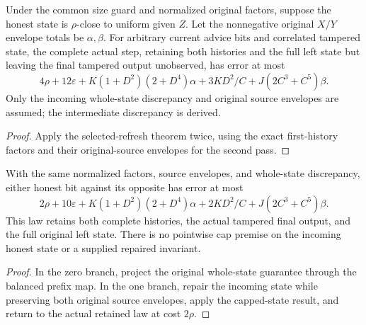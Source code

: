 \begin{theorem}
  \label{thm:lowerbounds-algebraic-flipflop-weak}
  \leanok
  Under the common size guard and normalized original factors, suppose
  the honest state is $\rho$-close to uniform given $Z$. Let the
  nonnegative original $X/Y$ envelope totals be $\alpha,\beta$.
  For arbitrary current advice bits and correlated tampered state, the
  complete actual step, retaining both histories and the full left state
  but leaving the final tampered output unobserved, has error at most
  \[
    4\rho+12\varepsilon+K(1+D^2)(2+D^4)\alpha+
      3KD^2/C+J(2C^3+C^5)\beta.
  \]
  Only the incoming whole-state discrepancy and original source
  envelopes are assumed; the intermediate discrepancy is derived.
\end{theorem}
\begin{proof}
  \leanok
  Apply the selected-refresh theorem twice, using the exact first-history
  factors and their original-source envelopes for the second pass.
\end{proof}

\begin{theorem}
  \label{thm:lowerbounds-algebraic-flipflop-opposite-uniform}
  \leanok
  With the same normalized factors, source envelopes, and whole-state
  discrepancy, either honest bit against its opposite has error at most
  \[
    2\rho+10\varepsilon+K(1+D^2)(2+D^4)\alpha+
      2KD^2/C+J(2C^3+C^5)\beta.
  \]
  This law retains both complete histories, the actual tampered final
  output, and the full original left state. There is no pointwise cap
  premise on the incoming honest state or a supplied repaired invariant.
\end{theorem}
\begin{proof}
  \leanok
  In the zero branch, project the original whole-state guarantee through
  the balanced prefix map. In the one branch, repair the incoming state
  while preserving both original source envelopes, apply the capped-state
  result, and return to the actual retained law at cost $2\rho$.
\end{proof}


